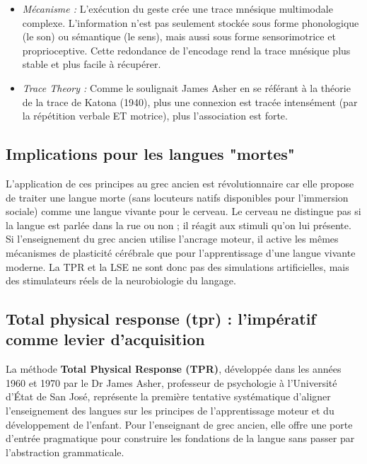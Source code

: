 \begin{itemize}\item \textit{Mécanisme :} L'exécution du geste crée une trace mnésique multimodale complexe. L'information n'est pas seulement stockée sous forme phonologique (le son) ou sémantique (le sens), mais aussi sous forme sensorimotrice et proprioceptive.\cite{III-2-2-ref9} Cette redondance de l'encodage rend la trace mnésique plus stable et plus facile à récupérer.\item \textit{Trace Theory :} Comme le soulignait James Asher en se référant à la théorie de la trace de Katona (1940), plus une connexion est \og tracée\fg{} intensément (par la répétition verbale ET motrice), plus l'association est forte.\cite{III-2-2-ref16}\end{itemize}

\subsection{Implications pour les langues "mortes"}

L'application de ces principes au grec ancien est révolutionnaire car elle propose de traiter une
langue \og morte\fg{} (sans locuteurs natifs disponibles pour l'immersion sociale) comme une langue
\og vivante\fg{} pour le cerveau. Le cerveau ne distingue pas si la langue est parlée dans la rue ou
non ; il réagit aux stimuli qu'on lui présente. Si l'enseignement du grec ancien utilise l'ancrage
moteur, il active les mêmes mécanismes de plasticité cérébrale que pour l'apprentissage d'une langue
vivante moderne.\cite{III-2-2-ref18} La TPR et la LSE ne sont donc pas des simulations
artificielles, mais des stimulateurs réels de la neurobiologie du langage.



\subsection{Total physical response (tpr) : l'impératif comme levier d'acquisition}

La méthode \textbf{Total Physical Response (TPR)}, développée dans les années 1960 et 1970 par le Dr
James Asher, professeur de psychologie à l'Université d'État de San José, représente la première
tentative systématique d'aligner l'enseignement des langues sur les principes de l'apprentissage
moteur et du développement de l'enfant.\cite{III-2-2-ref20} Pour l'enseignant de grec ancien, elle
offre une porte d'entrée pragmatique pour construire les fondations de la langue sans passer par
l'abstraction grammaticale.




